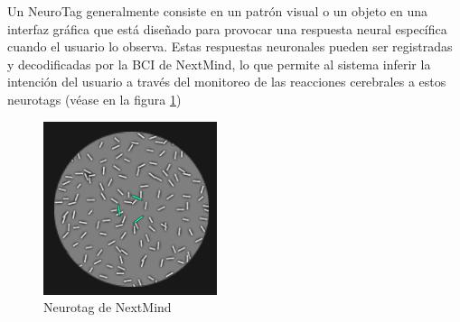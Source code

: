 Un NeuroTag generalmente consiste en un patrón visual o un objeto en una interfaz gráfica que está diseñado para provocar una respuesta neural específica cuando el usuario lo observa. Estas respuestas neuronales pueden ser registradas y decodificadas por la BCI de NextMind, lo que permite al sistema inferir la intención del usuario a través del monitoreo de las reacciones cerebrales a estos neurotags (véase en la figura \ref{figure:nextmind-neurotag})

\begin{figure}[!htb]
   \centering
    \includegraphics[width=0.4\linewidth]{figures/Neurotag.png}
   \caption{Neurotag de NextMind}
   \label{figure:nextmind-neurotag}
\end{figure}
